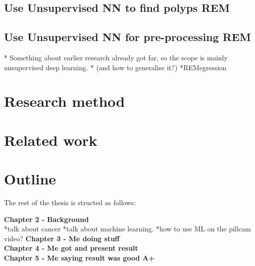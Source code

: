   \subsection{Use Unsupervised NN to find polyps REM}
  \subsection{Use Unsupervised NN for pre-processing REM}
		* Something about earlier research already got far, so the scope is mainly unsupervised deep learning.
		* (and how to generalise it?)
		*REMegression	
		

\section{Research method}
\section{Related work}
\section{Outline}
  The rest of the thesis is structed as follows:
	
  \textbf{Chapter 2 - Background}\\
	*talk about cancer
	*talk about machine learning.
	*how to use ML on the pillcam video?
  \textbf{Chapter 3 - Me doing stuff}\\
  \textbf{Chapter 4 - Me got and present result}\\
  \textbf{Chapter 5 - Me saying result was good A+}\\
